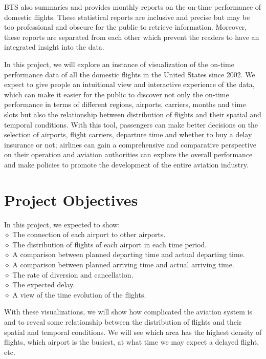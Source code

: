 \documentclass[12pt]{article}
\begin{document}
BTS also summaries and provides monthly reports on the on-time performance of domestic flights. These statistical reports are inclusive and precise but may be too professional and obscure for the public to retrieve information. Moreover, these reports are separated from each other which prevent the readers to have an integrated insight into the data.

In this project, we will explore an instance of visualization of the on-time performance data of all the domestic flights in the United States since 2002. We expect to give people an intuitional view and interactive experience of the data, which can make it easier for the public to discover not only the on-time performance in terms of different regions, airports, carriers, months and time slots but also the relationship between distribution of flights and their spatial and temporal conditions. With this tool, passengers can make better decisions on the selection of airports, flight carriers, departure time and whether to buy a delay insurance or not; airlines can gain a comprehensive and comparative perspective on their operation and aviation authorities can explore the overall performance and make policies to promote the development of the entire aviation industry.

\section{Project Objectives}
    \noindent In this project, we expected to show:\\
    $\diamond$ The connection of each airport to other airports.\\
    $\diamond$ The distribution of flights of each airport in each time period.\\
    $\diamond$ A comparison between planned departing time and actual departing time.\\
    $\diamond$ A comparison between planned arriving time and actual arriving time.\\
    $\diamond$ The rate of diversion and cancellation.\\
    $\diamond$ The expected delay.\\
    $\diamond$ A view of the time evolution of the flights.

    With these visualizations, we will show how complicated the aviation system is and to reveal some relationship between the distribution of flights and their spatial and temporal conditions. We will see which area has the highest density of flights, which airport is the busiest, at what time we may expect a delayed flight, etc.
\end{document}
